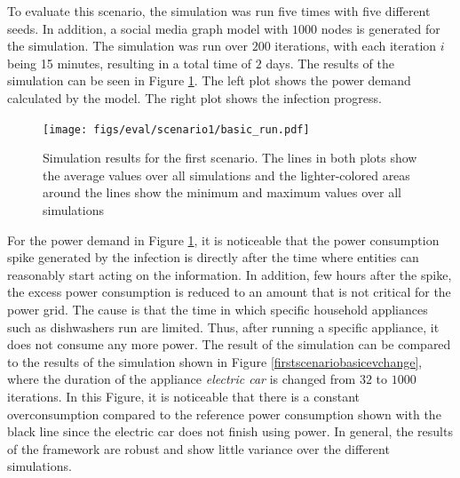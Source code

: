 To evaluate this scenario, the simulation was run five times with five 
different seeds. In addition, a social media
graph model with $1000$ nodes is generated for the simulation. 
The simulation was run over $200$ iterations, with each
iteration $i$ being 15 minutes, resulting in a total time of $2$ days.
The results of the simulation can be seen in Figure \ref{firstscenariobasicresult}.
The left plot shows the power demand calculated by the model. The right 
plot shows the infection progress.


\begin{figure}[!ht]
    \center
    \texttt{[image: figs/eval/scenario1/basic\_run.pdf]}
    \caption{Simulation results for the first scenario. The lines in both plots show the average values over all simulations and 
    the lighter-colored areas around the lines show the minimum and maximum values
    over all simulations}
    \label{firstscenariobasicresult}
\end{figure}

For the power demand in Figure \ref{firstscenariobasicresult}, 
it is noticeable
that the power consumption spike generated by the infection is directly
after the time where entities can reasonably start acting on the information.
In addition, few hours after the spike, the excess power consumption
is reduced to an amount that is not critical for the power grid. 
The cause is that the time in which specific household appliances
such as dishwashers run are limited. Thus, after running a specific
appliance, it does not consume any more power. The result of the simulation
can be compared to the results of the simulation shown in 
Figure \ref{firstscenariobasicevchange}, where the duration of the 
appliance \textit{electric car} is changed from $32$ to $1000$ iterations.
In this Figure, it is noticeable 
that there is a constant overconsumption compared to the reference
power consumption shown with the black line since the electric car
does not finish using power.
In general, the 
results of the framework are robust and show little variance over the
different simulations. 

